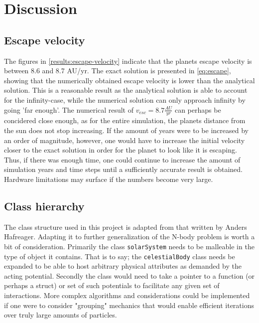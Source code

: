 \section{Discussion}
\subsection{Escape velocity}
The figures in \ref{results:escape-velocity} indicate that the planets escape velocity is between
8.6 and 8.7 AU/yr. The exact solution is presented in \ref{eq:escape}, showing that the numerically
obtained escape velocity is lower than the analytical solution. This is a reasonable result as the 
analytical solution is able to account for the infinity-case, while the numerical solution can only
approach infinity by going 'far enough'. The numerical result of $v_{esc} = 8.7 \tfrac{AU}{yr}$ can 
perhaps be concidered close enough, as for the entire simulation, the planets distance from the sun 
does not stop increasing. If the amount of years were to be increased by an order of magnitude, 
however, one would have to increase the initial velocity closer to the exact solution in order for 
the planet to look like it is escaping. Thus, if there was enough time, one could continue to  
increase the amount of simulation years and time steps until a sufficiently accurate result is
obtained. Hardware limitations may surface if the numbers become very large.


\subsection*{Class hierarchy}

The class structure used in this project is adapted from that written by Anders Hafreager. Adapting it to further generalization of the N-body problem is worth a bit of consideration. Primarily the class \lstinline{solarSystem} needs to be malleable  in the type of object it contains. That is to say; the \lstinline{celestialBody} class needs be expanded to be able to host arbitrary physical attributes as demanded by the acting potential. Secondly the class would need to take a pointer to a function (or perhaps a struct) or set of such potentials to facilitate any given set of interactions. More complex algorithms and considerations could be implemented if one were to consider "grouping" mechanics that would enable efficient iterations over truly large amounts of particles.
